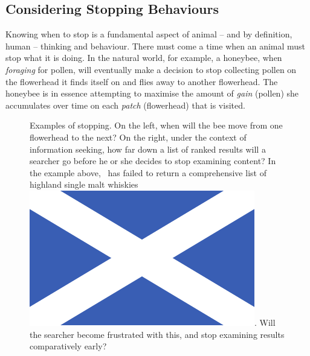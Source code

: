 \subsection{Considering Stopping Behaviours}
Knowing when to stop is a fundamental aspect of animal -- and by definition, human -- thinking and behaviour. There must come a time when an animal must stop what it is doing. In the natural world, for example, a honeybee, when \emph{foraging} for pollen, will eventually make a decision to stop collecting pollen on the flowerhead it finds itself on and flies away to another flowerhead. The honeybee is in essence attempting to maximise the amount of \emph{gain} (pollen) she accumulates over time on each \emph{patch} (flowerhead) that is visited.

\begin{figure}[t!]
    \centering
    \caption[Animal and searcher stopping examples]{Examples of stopping. On the left, when will the bee move from one flowerhead to the next? On the right, under the context of information seeking, how far down a list of ranked results will a searcher go before he or she decides to stop examining content? In the example above, \searchlogo~has failed to return a comprehensive list of highland single malt whiskies~\includegraphics[height=\fontcharht\font`\d]{figures/ch0-saltire.pdf}. Will the searcher become frustrated with this, and stop examining results comparatively early?}
    \label{fig:ch1-stopping}
\end{figure}

